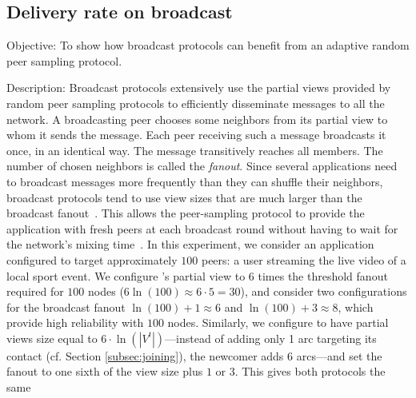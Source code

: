 

\subsection{Delivery rate on broadcast}

\begin{asparadesc}
\item [Objective:] To show how broadcast protocols can benefit from
  an adaptive random peer sampling protocol.
\item [Description:] Broadcast protocols extensively use the partial
  views provided by random peer sampling protocols to efficiently
  disseminate messages to all the network. A broadcasting peer chooses
  some neighbors from its partial view to whom it sends the
  message. Each peer receiving such a message broadcasts it once, in
  an identical way. The message transitively reaches all members. The
  number of chosen neighbors is called the \emph{fanout}. Since
  several applications need to broadcast messages more frequently than
  they can shuffle their neighbors, broadcast protocols tend to use
  view sizes that are much larger than the broadcast
  fanout~\cite{Frey09Middleware}. This allows the peer-sampling
  protocol to provide the application with fresh peers at each
  broadcast round without having to wait for the network's mixing
  time~\cite{jelasity2007gossip}. In this experiment, we consider an
  application configured to target approximately $100$ peers: a user
  streaming the live video of a local sport event. We configure
  \CYCLON's partial view to $6$ times the threshold fanout required
  for $100$ nodes ($6 \ln(100) \approx 6 \cdot 5 = 30$), and consider
  two configurations for the broadcast fanout $\ln(100)+1 \approx 6 $
  and $\ln(100)+3 \approx 8$, which provide high reliability with
  $100$ nodes. Similarly, we configure \SPRAY to have partial views
  size equal to $6 \cdot \ln(|V^t|)$---instead of adding only 1 arc
  targeting its contact (cf. Section \ref{subsec:joining}), the
  newcomer adds 6 arcs---and set the fanout to one sixth of the view
  size plus $1$ or $3$. This gives both protocols the same

\end{asparadesc}

